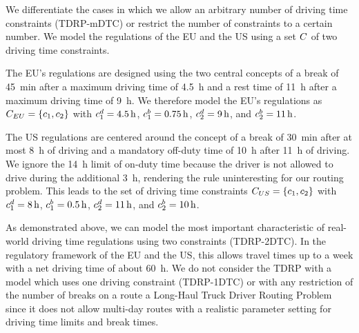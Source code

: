 We differentiate the cases in which we allow an arbitrary number of driving time constraints (TDRP-mDTC) or restrict the number of constraints to a certain number. We model the regulations of the EU and the US using a set $C$ of two driving time constraints.

The EU's regulations are designed using the two central concepts of a break of \SI{45}{\minute} after a maximum driving time of \SI{4.5}{\hour} and a rest time of \SI{11}{\hour} after a maximum driving time of \SI{9}{\hour}. We therefore model the EU's regulations as $C_{EU} = \{c_1, c_2\}$ with $c_1^d = \SI{4.5}{\hour}$, $c_1^b = \SI{0.75}{\hour}$, $c_2^d = \SI{9}{\hour}$, and $ c_2^b = \SI{11}{\hour}$.

The US regulations are centered around the concept of a break of \SI{30}{\minute} after at most \SI{8}{\hour} of driving and a mandatory off-duty time of \SI{10}{\hour} after \SI{11}{\hour} of driving. We ignore the \SI{14}{\hour} limit of on-duty time because the driver is not allowed to drive during the additional \SI{3}{\hour}, rendering the rule uninteresting for our routing problem. This leads to the set of driving time constraints $C_{US} = \{c_1, c_2\}$ with $c_1^d = \SI{8}{\hour}$, $c_1^b = \SI{0.5}{\hour}$, $c_2^d = \SI{11}{\hour}$, and $c_2^b = \SI{10}{\hour}$.

As demonstrated above, we can model the most important characteristic of real-world driving time regulations using two constraints (TDRP-2DTC). In the regulatory framework of the EU and the US, this allows travel times up to a week with a net driving time of about \SI{60}{\hour}. We do not consider the TDRP with a model which uses one driving constraint (TDRP-1DTC) or with any restriction of the number of breaks on a route a Long-Haul Truck Driver Routing Problem since it does not allow multi-day routes with a realistic parameter setting for driving time limits and break times.